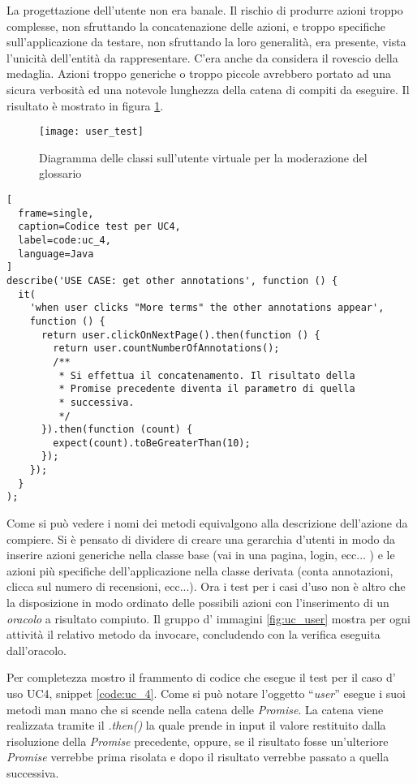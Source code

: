 La progettazione dell'utente non era banale. Il rischio di produrre azioni
troppo complesse, non sfruttando la concatenazione delle azioni, e troppo
specifiche sull'applicazione da testare, non sfruttando la loro generalità,
era presente, vista l'unicità dell'entità da rappresentare. C'era anche da
considera il rovescio della medaglia. Azioni troppo generiche o troppo piccole
avrebbero portato ad una sicura verbosità ed una notevole lunghezza della catena
di compiti da eseguire. Il risultato è mostrato in figura \ref{fig:user_test}.

\begin{figure}[H]
\begin{center}
\texttt{[image: user\_test]}
\caption{
Diagramma delle classi sull'utente virtuale per la moderazione del glossario
}
\label{fig:user_test}
\end{center}
\end{figure}

\begin{center}
\begin{lstlisting}[
  frame=single,
  caption=Codice test per UC4,
  label=code:uc_4,
  language=Java
]
describe('USE CASE: get other annotations', function () {
  it(
    'when user clicks "More terms" the other annotations appear',
    function () {
      return user.clickOnNextPage().then(function () {
        return user.countNumberOfAnnotations();
        /**
         * Si effettua il concatenamento. Il risultato della
         * Promise precedente diventa il parametro di quella
         * successiva.
         */
      }).then(function (count) {
        expect(count).toBeGreaterThan(10);
      });
    });
  }
);
\end{lstlisting}
\end{center}

Come si può vedere i nomi dei metodi equivalgono alla descrizione dell'azione
da compiere. Si è pensato di dividere di creare una gerarchia d'utenti in modo
da inserire azioni generiche nella classe base (vai in una pagina, login, ecc...
) e le azioni più specifiche dell'applicazione nella classe derivata (conta
annotazioni, clicca sul numero di recensioni, ecc...). Ora i test per i casi
d'uso non è altro che la disposizione in modo ordinato delle possibili azioni
con l'inserimento di un \textit{oracolo} a risultato compiuto. Il gruppo d'
immagini \ref{fig:uc_user} mostra per ogni attività il relativo metodo da
invocare, concludendo con la verifica eseguita dall'oracolo.

Per completezza mostro il frammento di codice che esegue il test per il caso d'
uso UC4, snippet \ref{code:uc_4}. Come si può notare l'oggetto ``\textit{user}''
esegue i suoi metodi man mano che si scende nella catena delle \textit{Promise}.
La catena viene realizzata tramite il \textit{.then()} la quale prende in input
il valore restituito dalla risoluzione della \textit{Promise} precedente,
oppure, se il risultato fosse un'ulteriore \textit{Promise} verrebbe prima
risolata e dopo il risultato verrebbe passato a quella successiva.

